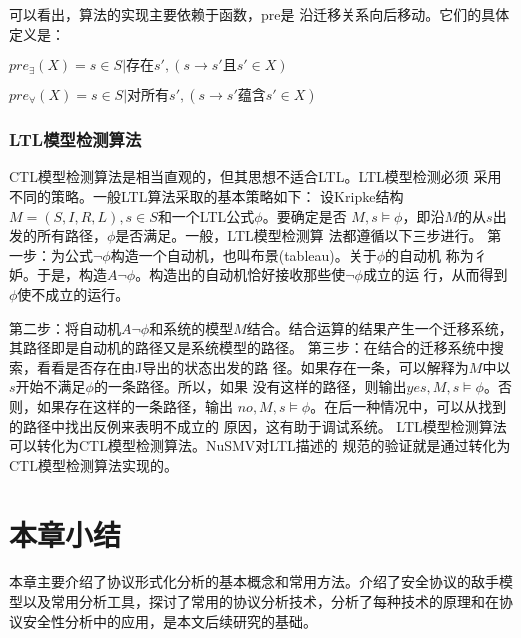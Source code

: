 可以看出，算法的实现主要依赖于函数，pre是
沿迁移关系向后移动。它们的具体定义是：

$pre_\exists (X)={s\in S|存在s',(s\to s'且s'\in X)}$

$pre_\forall(X)={s\in S|对所有s',(s\to s'蕴含s'\in X)}$

\subsubsection{LTL模型检测算法}
CTL模型检测算法是相当直观的，但其思想不适合LTL。LTL模型检测必须
采用不同的策略。一般LTL算法采取的基本策略如下：
设Kripke结构$M=(S,I,R,L),s\in S$和一个LTL公式$\phi$。要确定是否
$M,s\models \phi$，即沿$M$的从$s$出发的所有路径，$\phi$是否满足。一般，LTL模型检测算
法都遵循以下三步进行。
第一步：为公式$\neg\phi$构造一个自动机，也叫布景(tableau)。关于$\phi$的自动机
称为彳妒。于是，构造$A\neg\phi$。构造出的自动机恰好接收那些使$\neg\phi$成立的运
行，从而得到$\phi$使不成立的运行。

第二步：将自动机$A\neg\phi$和系统的模型$M$结合。结合运算的结果产生一个迁移系统，其路径即是自动机的路径又是系统模型的路径。
第三步：在结合的迁移系统中搜索，看看是否存在由J导出的状态出发的路
径。如果存在一条，可以解释为$M$中以$s$开始不满足$\phi$的一条路径。所以，如果
没有这样的路径，则输出$yes,M,s\models \phi$。否则，如果存在这样的一条路径，输出
$no,M,s\models \phi$。在后一种情况中，可以从找到的路径中找出反例来表明不成立的
原因，这有助于调试系统。
LTL模型检测算法可以转化为CTL模型检测算法。NuSMV对LTL描述的
规范的验证就是通过转化为CTL模型检测算法实现的。



\section{本章小结}
本章主要介绍了协议形式化分析的基本概念和常用方法。介绍了安全协议的敌手模型以及常用分析工具，探讨了常用的协议分析技术，分析了每种技术的原理和在协议安全性分析中的应用，是本文后续研究的基础。
